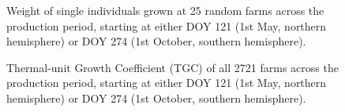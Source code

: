 \documentclass[
  a4paper,
]{article}
\begin{document}
\begin{figure}


\caption{\label{fig-ref-weight}Weight of single individuals grown at 25
random farms across the production period, starting at either DOY 121
(1st May, northern hemisphere) or DOY 274 (1st October, southern
hemisphere).}

\end{figure}%

\begin{figure}


\caption{\label{fig-ref-TGC}Thermal-unit Growth Coefficient (TGC) of all
2721 farms across the production period, starting at either DOY 121 (1st
May, northern hemisphere) or DOY 274 (1st October, southern
hemisphere).}

\end{figure}%
\end{document}
